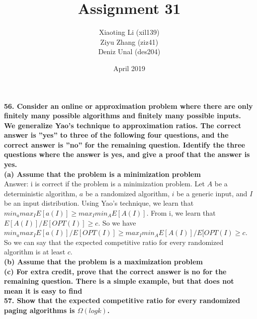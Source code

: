 \documentclass{article}
\title{Assignment 31}
\author{Xiaoting Li (xil139) \\
Ziyu Zhang (ziz41) \\
Deniz Unal (des204)}
\date{April 2019}
\begin{document}
\noindent
\textbf{56. Consider an online or approximation problem where there are only finitely many possible algorithms and finitely many possible inputs. We generalize Yao’s technique to approximation ratios. The correct answer is ”yes” to three of the following four questions, and the correct answer is ”no” for the remaining question. Identify the three questions where the answer is yes, and give a proof that the answer is yes.} \\ \newline
\textbf{(a) Assume that the problem is a minimization problem} \\ \newline
Answer: i is correct if the problem is a minimization problem. Let $A$ be a deterministic algorithm, $a$ be a randomized algorithm, $i$ be a generic input, and $I$ be an input distribution. Using Yao's technique, we learn that $min_a max_I E[a(I)] \geq max_I min_A E[A(I)]$. From i, we learn that $E[A(I)]/E[OPT(I)] \geq c$. So we have $min_a max_I E[a(I)]/E[OPT(I)] \geq max_I min_A E[A(I)]/E[OPT(I) \geq c$. So we can say that the expected competitive ratio for every randomized algorithm is at least $c$. \\ \newline
\textbf{(b) Assume that the problem is a maximization problem} \\ \newline
\textbf{(c) For extra credit, prove that the correct answer is no for the remaining question. There is a simple example, but that does not mean it is easy to find} \\ \newline
\textbf{57. Show that the expected competitive ratio for every randomized paging algorithms is
$\Omega(logk)$.}
\end{document}

